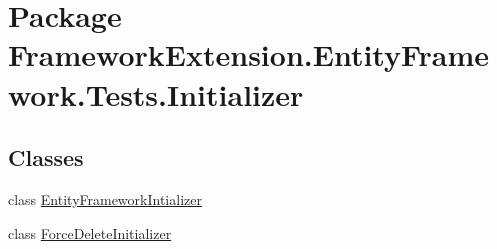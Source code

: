 \hypertarget{namespace_framework_extension_1_1_entity_framework_1_1_tests_1_1_initializer}{\section{Package Framework\-Extension.\-Entity\-Framework.\-Tests.\-Initializer}
\label{namespace_framework_extension_1_1_entity_framework_1_1_tests_1_1_initializer}
}
\subsection*{Classes}
\begin{DoxyCompactItemize}
\item 
class \hyperlink{class_framework_extension_1_1_entity_framework_1_1_tests_1_1_initializer_1_1_entity_framework_intializer}{Entity\-Framework\-Intializer}
\item 
class \hyperlink{class_framework_extension_1_1_entity_framework_1_1_tests_1_1_initializer_1_1_force_delete_initializer}{Force\-Delete\-Initializer}
\end{DoxyCompactItemize}
